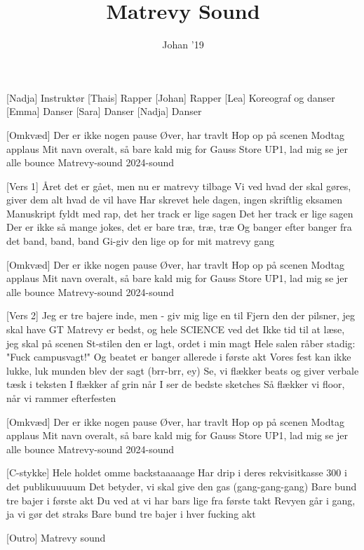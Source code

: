 \documentclass[a4paper,11pt]{article}
\title{Matrevy Sound}
\author{Johan '19}
\begin{document}
\maketitle

\begin{roles}
[Nadja] Instruktør
[Thais] Rapper
[Johan] Rapper 
[Lea] Koreograf og danser
[Emma] Danser
[Sara] Danser
[Nadja] Danser
\end{roles}

\begin{song}
  [Omkvæd] Der er ikke nogen pause
Øver, har travlt
Hop op på scenen
Modtag applaus
Mit navn overalt, så bare kald mig for Gauss
Store UP1, lad mig se jer alle bounce
Matrevy-sound
2024-sound

  [Vers 1] Året det er gået, men nu er matrevy tilbage
Vi ved hvad der skal gøres, giver dem alt hvad de vil have
Har skrevet hele dagen, ingen skriftlig eksamen
Manuskript fyldt med rap, det her track er lige sagen
Det her track er lige sagen
Der er ikke så mange jokes, det er bare træ, træ, træ
Og banger efter banger fra det band, band, band
Gi-giv den lige op for mit matrevy gang

   [Omkvæd]  Der er ikke nogen pause
Øver, har travlt
Hop op på scenen
Modtag applaus
Mit navn overalt, så bare kald mig for Gauss
Store UP1, lad mig se jer alle bounce
Matrevy-sound
2024-sound

 [Vers 2] Jeg er tre bajere inde, men - giv mig lige en til
Fjern den der pilsner, jeg skal have GT
Matrevy er bedst, og hele SCIENCE ved det
Ikke tid til at læse, jeg skal på scenen
St-stilen den er lagt, ordet i min magt
Hele salen råber stadig: "Fuck campusvagt!"
Og beatet er banger allerede i første akt
Vores fest kan ikke lukke, luk munden blev der sagt
(brr-brr, ey)
Se, vi flækker beats og giver verbale tæsk i teksten
I flækker af grin når I ser de bedste sketches
Så flækker vi floor, når vi rammer efterfesten

[Omkvæd] Der er ikke nogen pause
Øver, har travlt
Hop op på scenen
Modtag applaus
Mit navn overalt, så bare kald mig for Gauss
Store UP1, lad mig se jer alle bounce
Matrevy-sound
2024-sound

  [C-stykke] Hele holdet omme backstaaaaage
Har drip i deres rekvisitkasse
300 i det publikuuuuum
Det betyder, vi skal give den gas (gang-gang-gang)
Bare bund tre bajer i første akt
Du ved at vi har bars lige fra første takt
Revyen går i gang, ja vi gør det straks
Bare bund tre bajer i hver fucking akt

 [Outro] Matrevy sound
  
\end{song}
\end{document}
